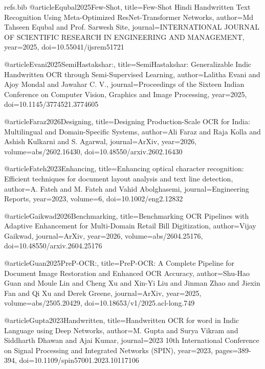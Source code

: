 \begin{filecontents}{refs.bib}
    @article{Equbal2025Few-Shot,
    title={Few-Shot Hindi Handwritten Text Recognition Using Meta-Optimized ResNet-Transformer Networks},
    author={Md Tahseen Equbal and Prof. Sarwesh Site},
    journal={INTERNATIONAL JOURNAL OF SCIENTIFIC RESEARCH IN ENGINEERING AND MANAGEMENT},
    year={2025},
    doi={10.55041/ijsrem51721}
    }
    
    @article{Evani2025SemiHastakshar:,
    title={SemiHastakshar: Generalizable Indic Handwritten OCR through Semi-Supervised Learning},
    author={Lalitha Evani and Ajoy Mondal and Jawahar C. V.},
    journal={Proceedings of the Sixteen Indian Conference on Computer Vision, Graphics and Image Processing},
    year={2025},
    doi={10.1145/3774521.3774605}
    }
    
    @article{Faraz2026Designing,
    title={Designing Production-Scale OCR for India: Multilingual and Domain-Specific Systems},
    author={Ali Faraz and Raja Kolla and Ashish Kulkarni and S. Agarwal},
    journal={ArXiv},
    year={2026},
    volume={abs/2602.16430},
    doi={10.48550/arxiv.2602.16430}
    }
    
    @article{Fateh2023Enhancing,
    title={Enhancing optical character recognition: Efficient techniques for document layout analysis and text line detection},
    author={A. Fateh and M. Fateh and Vahid Abolghasemi},
    journal={Engineering Reports},
    year={2023},
    volume={6},
    doi={10.1002/eng2.12832}
    }
    
    @article{Gaikwad2026Benchmarking,
    title={Benchmarking OCR Pipelines with Adaptive Enhancement for Multi-Domain Retail Bill Digitization},
    author={Vijay Gaikwad},
    journal={ArXiv},
    year={2026},
    volume={abs/2604.25176},
    doi={10.48550/arxiv.2604.25176}
    }
    
    @article{Guan2025PreP-OCR:,
    title={PreP-OCR: A Complete Pipeline for Document Image Restoration and Enhanced OCR Accuracy},
    author={Shu-Hao Guan and Moule Lin and Cheng Xu and Xin-Yi Liu and Jinman Zhao and Jiexin Fan and Qi Xu and Derek Greene},
    journal={ArXiv},
    year={2025},
    volume={abs/2505.20429},
    doi={10.18653/v1/2025.acl-long.749}
    }
    
    @article{Gupta2023Handwritten,
    title={Handwritten OCR for word in Indic Language using Deep Networks},
    author={M. Gupta and Surya Vikram and Siddharth Dhawan and Ajai Kumar},
    journal={2023 10th International Conference on Signal Processing and Integrated Networks (SPIN)},
    year={2023},
    pages={389-394},
    doi={10.1109/spin57001.2023.10117106}
    }
    

\end{filecontents}
